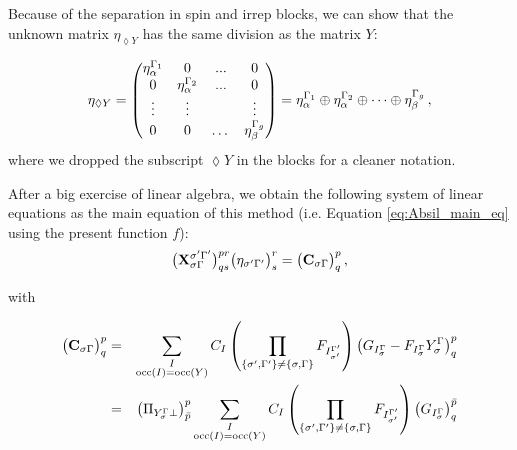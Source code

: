 Because of the separation in spin and irrep blocks, we can show that the unknown matrix $\eta_{\lozenge Y}$ has the same division as the matrix $Y$:

\begin{equation}\label{eq:eta_spin_irrep_blocks}
  \eta_{\lozenge Y} =
  \begin{pmatrix}
    \eta_\alpha^{\Gamma_1} & 0 & ... & 0\\
    0 & \eta_\alpha^{\Gamma_2} & ... & 0 \\
    \vdots & \vdots & & \vdots\\
    0 & 0 &\dots & \eta_\beta^{\Gamma_g}\\
  \end{pmatrix}
  = \eta_\alpha^{\Gamma_1} \oplus \eta_\alpha^{\Gamma_2} \oplus \dots \oplus \eta_\beta^{\Gamma_g}\,,
\end{equation}
where we dropped the subscript $\lozenge Y$ in the blocks for a cleaner notation.

After a big exercise of linear algebra, we obtain the following system of linear equations as the main equation of this method (i.e. Equation \eqref{eq:Absil_main_eq} using the present function $f$):
\begin{equation}
  \big( \mathbf{X}_{\sigma \Gamma}^{\sigma' {\Gamma'}} \big)^{pr}_{qs} \big( \eta_{\sigma' {\Gamma'}} \big)^r_s
  = \big( \mathbf{C}_{\sigma \Gamma} \big)^p_q\,,
\end{equation}

with

\begin{eqnarray}
  \big( \mathbf{C}_{\sigma \Gamma} \big)^p_q &=&
  \sum_{\substack{I\\\text{occ}(I) = \text{occ}(Y)}} C_I
  \left( \prod_{\{\sigma', {\Gamma'}\} \ne \{\sigma, \Gamma\}} F_{I_{\sigma'}^{\Gamma'}} \right)
  \left( G_{I_\sigma^{\Gamma}} - F_{I_\sigma^{\Gamma}} Y_\sigma^{\Gamma}  \right)^p_q\\
  &=&
  \big( \Pi_{Y_\sigma^{\Gamma} \perp} \big)^p_{\bar{p}}
  \sum_{\substack{I\\\text{occ}(I) = \text{occ}(Y)}} C_I
  \left( \prod_{\{\sigma', {\Gamma'}\} \ne \{\sigma, \Gamma\}} F_{I_{\sigma'}^{\Gamma'}} \right)
  \left( G_{I_\sigma^{\Gamma}} \right)^{\bar{p}}_q
\end{eqnarray}

